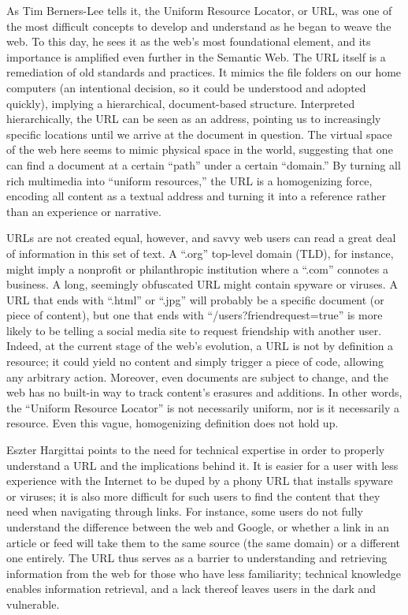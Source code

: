 As Tim Berners-Lee tells it, the Uniform Resource Locator, or URL, was one of the most difficult concepts to develop and understand as he began to weave the web.\autocite{berners-lee} To this day, he sees it as the web's most foundational element, and its importance is amplified even further in the Semantic Web. The URL itself is a remediation of old standards and practices. It mimics the file folders on our home computers (an intentional decision, so it could be understood and adopted quickly), implying a hierarchical, document-based structure. Interpreted hierarchically, the URL can be seen as an address, pointing us to increasingly specific locations until we arrive at the document in question. The virtual space of the web here seems to mimic physical space in the world, suggesting that one can find a document at a certain ``path'' under a certain ``domain.'' By turning all rich multimedia into ``uniform resources,'' the URL is a homogenizing force, encoding all content as a textual address and turning it into a reference rather than an experience or narrative.

URLs are not created equal, however, and savvy web users can read a great deal of information in this set of text. A ``.org'' top-level domain (TLD), for instance, might imply a nonprofit or philanthropic institution where a ``.com'' connotes a business. A long, seemingly obfuscated URL might contain spyware or viruses. A URL that ends with ``.html'' or ``.jpg'' will probably be a specific document (or piece of content), but one that ends with ``/users?friendrequest=true'' is more likely to be telling a social media site to request friendship with another user. Indeed, at the current stage of the web's evolution, a URL is not by definition a resource; it could yield no content and simply trigger a piece of code, allowing any arbitrary action. Moreover, even documents are subject to change, and the web has no built-in way to track content's erasures and additions. In other words, the ``Uniform Resource Locator'' is not necessarily uniform, nor is it necessarily a resource. Even this vague, homogenizing definition does not hold up.\autocite{figure here with detailed annotations of a single URL}

Eszter Hargittai points to the need for technical expertise in order to properly understand a URL and the implications behind it.\autocite{hargittai} It is easier for a user with less experience with the Internet to be duped by a phony URL that installs spyware or viruses; it is also more difficult for such users to find the content that they need when navigating through links. For instance, some users do not fully understand the difference between the web and Google, or whether a link in an article or feed will take them to the same source (the same domain) or a different one entirely. The URL thus serves as a barrier to understanding and retrieving information from the web for those who have less familiarity; technical knowledge enables information retrieval, and a lack thereof leaves users in the dark and vulnerable.

